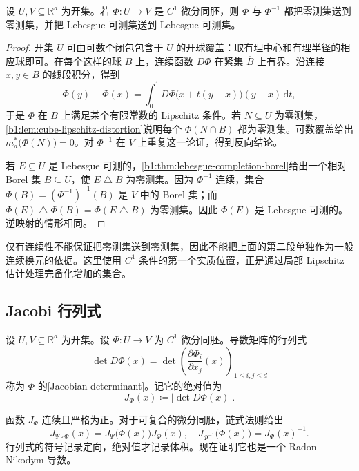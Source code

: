 \begin{proposition}\label{b1:prop:diffeomorphism-measurability}
设 \(U,V\subseteq\mathbb R^d\) 为开集。若 \(\Phi:U\rightarrow V\) 是 \(C^1\) 微分同胚，则 \(\Phi\) 与 \(\Phi^{-1}\) 都把零测集送到零测集，并把 Lebesgue 可测集送到 Lebesgue 可测集。
\end{proposition}
\begin{proof}
开集 \(U\) 可由可数个闭包包含于 \(U\) 的开球覆盖：取有理中心和有理半径的相应球即可。在每个这样的球 \(B\) 上，连续函数 \(D\Phi\) 在紧集 \(\overline B\) 上有界。沿连接 \(x,y\in B\) 的线段积分，得到
\[
\Phi(y)-\Phi(x)=\int_0^1D\Phi\bigl(x+t(y-x)\bigr)(y-x)\,\mathrm{d}t,
\]
于是 \(\Phi\) 在 \(B\) 上满足某个有限常数的 Lipschitz 条件。若 \(N\subseteq U\) 为零测集，\cref{b1:lem:cube-lipschitz-distortion}说明每个 \(\Phi(N\cap B)\) 都为零测集。可数覆盖给出 \(m_d^*\bigl(\Phi(N)\bigr)=0\)。对 \(\Phi^{-1}\) 在 \(V\) 上重复这一论证，得到反向结论。

若 \(E\subseteq U\) 是 Lebesgue 可测的，\cref{b1:thm:lebesgue-completion-borel}给出一个相对 Borel 集 \(B\subseteq U\)，使 \(E\mathbin{\triangle}B\) 为零测集。因为 \(\Phi^{-1}\) 连续，集合 \(\Phi(B)=(\Phi^{-1})^{-1}(B)\) 是 \(V\) 中的 Borel 集；而
\(\Phi(E)\mathbin{\triangle}\Phi(B)=\Phi(E\mathbin{\triangle}B)\) 为零测集。因此 \(\Phi(E)\) 是 Lebesgue 可测的。逆映射的情形相同。
\end{proof}

仅有连续性不能保证把零测集送到零测集，因此不能把上面的第二段单独作为一般连续换元的依据。这里使用 \(C^1\) 条件的第一个实质位置，正是通过局部 Lipschitz 估计处理完备化增加的集合。

\subsection{Jacobi 行列式}
\label{b1:subsec:070503}

\begin{definition}\label{b1:def:jacobian-determinant}
设 \(U,V\subseteq\mathbb R^d\) 为开集。设 \(\Phi:U\rightarrow V\) 为 \(C^1\) 微分同胚。导数矩阵的行列式
\[
\det D\Phi(x)
=\det\left(\frac{\partial\Phi_i}{\partial x_j}(x)\right)_{1\leq i,j\leq d}
\]
称为 \(\Phi\) 的[Jacobian determinant]。记它的绝对值为
\[
J_\Phi(x)\coloneqq|\det D\Phi(x)|.
\]
\end{definition}

函数 \(J_\Phi\) 连续且严格为正。对于可复合的微分同胚，链式法则给出
\[
J_{\Psi\circ\Phi}(x)=J_\Psi\bigl(\Phi(x)\bigr)J_\Phi(x),
\quad
J_{\Phi^{-1}}\bigl(\Phi(x)\bigr)=J_\Phi(x)^{-1}.
\]
行列式的符号记录定向，绝对值才记录体积。现在证明它也是一个 Radon--Nikodym 导数。

